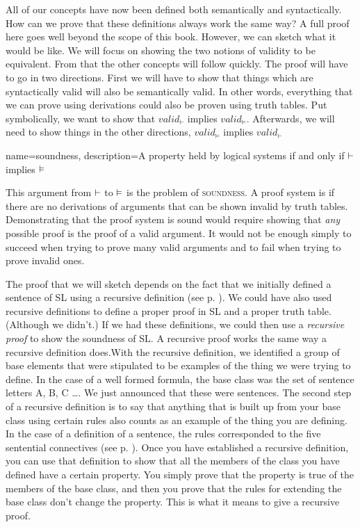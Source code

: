 All of our concepts have now been defined both semantically and syntactically. How can we prove that these definitions always work the same way? A full proof here goes well beyond the scope of this book. However, we can sketch what it would be like. We will focus on showing the two notions of validity to be equivalent.  From that the other concepts will follow quickly. The proof will have to go in two directions. First we will have to show that things which are syntactically valid will also be semantically valid. In other words, everything that we can prove using derivations could also be proven using truth tables. Put symbolically, we want to show that $valid_{\vdash}$ implies $valid_{\models}$. Afterwards, we will need to show things in the other directions,  $valid_{\models}$ implies $valid_{\vdash}$

{
name=soundness,
description={A property held by logical systems if and only if $\vdash $ implies $\vDash $}
}

This argument from $\vdash $ to $\vDash $ is the problem of \textsc{\gls{soundness}}. \label{def:soundness} A proof system is  if there are no derivations of arguments that can be shown invalid by truth tables. \label{def_Soundness} Demonstrating that the proof system is sound would require showing that \emph{any} possible proof is the proof of a valid argument. It would not be enough simply to succeed when trying to prove many valid arguments and to fail when trying to prove invalid ones.

The proof that we will sketch depends on the fact that we initially defined a sentence of SL using a recursive definition (see p. \pageref{def:recursive_definition}). We could have also used recursive definitions to define a proper proof in SL and a proper truth table. (Although we didn't.) If we had these definitions, we could then use a \emph{recursive proof} to show the soundness of SL. A recursive proof works the same way a recursive definition does.With the recursive definition, we identified a group of base elements that were stipulated to be examples of the thing we were trying to define. In the case of a well formed formula, the base class was the set of sentence letters A, B, C \ldots{}. We just announced that these were sentences. The second step of a recursive definition is to say that anything that is built up from your base class using certain rules also counts as an example of the thing you are defining. In the case of a definition of a sentence, the rules corresponded to the five sentential connectives (see p. \pageref{def:sentence_of_SL}). Once you have established a recursive definition, you can use that definition to show that all the members of the class you have defined have a certain property. You simply prove that the property is true of the members of the base class, and then you prove that the rules for extending the base class don't change the property. This is what it means to give a recursive proof.

